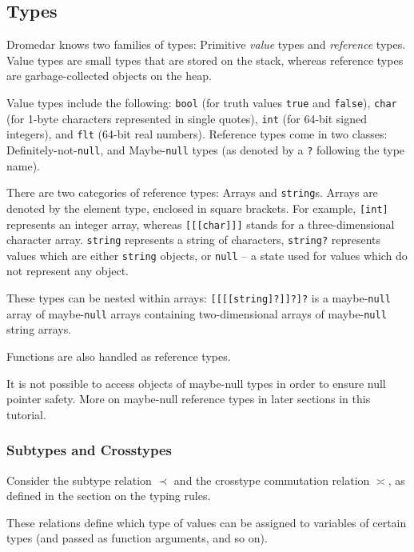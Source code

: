 \documentclass{article}
\newcommand{\code}[1]{\lstinline[columns=fixed]{#1}}
\begin{document}
		\subsection{Types}
		
			Dromedar knows two families of types: Primitive \textit{value} types and \textit{reference} types. Value types are small types that are stored on the stack, whereas reference types are garbage-collected objects on the heap.
			
			Value types include the following: \code{bool} (for truth values \code{true} and \code{false}), \code{char} (for 1-byte characters represented in single quotes), \code{int} (for 64-bit signed integers), and \code{flt} (64-bit real numbers). Reference types come in two classes: Definitely-not-\code{null}, and Maybe-\code{null} types (as denoted by a \code{?} following the type name).
			
			There are two categories of reference types: Arrays and \code{string}s. Arrays are denoted by the element type, enclosed in square brackets. For example, \code{[int]} represents an integer array, whereas \code{[[[char]]]} stands for a three-dimensional character array. \code{string} represents a string of characters, \code{string?} represents values which are either \code{string} objects, or \code{null} -- a state used for values which do not represent any object.
			
			These types can be nested within arrays: \code{[[[[string]?]]?]?} is a maybe-\code{null} array of maybe-\code{null} arrays containing two-dimensional arrays of maybe-\code{null} string arrays.
			
			Functions are also handled as reference types.
			
			It is not possible to access objects of maybe-null types in order to ensure null pointer safety. More on maybe-null reference types in later sections in this tutorial.
			
			\subsubsection{Subtypes and Crosstypes}
			
				Consider the subtype relation $\prec$ and the crosstype commutation relation $\asymp$, as defined in the section on the typing rules.
				
				These relations define which type of values can be assigned to variables of certain types (and passed as function arguments, and so on).
				
\end{document}
